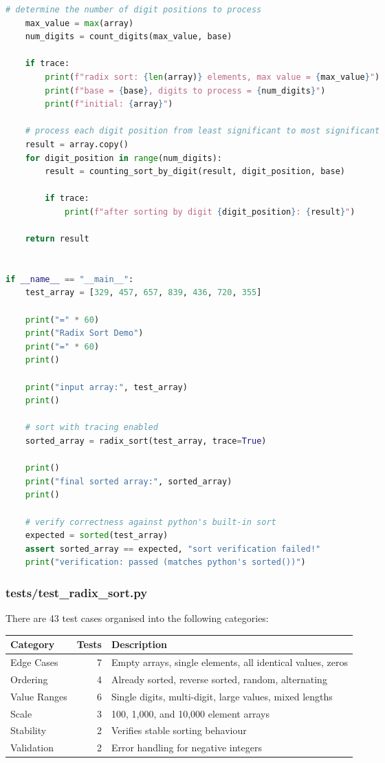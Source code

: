 \documentclass[12pt]{article}
\begin{document}
\begin{lstlisting}[language=Python]
    # determine the number of digit positions to process
    max_value = max(array)
    num_digits = count_digits(max_value, base)

    if trace:
        print(f"radix sort: {len(array)} elements, max value = {max_value}")
        print(f"base = {base}, digits to process = {num_digits}")
        print(f"initial: {array}")

    # process each digit position from least significant to most significant
    result = array.copy()
    for digit_position in range(num_digits):
        result = counting_sort_by_digit(result, digit_position, base)

        if trace:
            print(f"after sorting by digit {digit_position}: {result}")

    return result


if __name__ == "__main__":
    test_array = [329, 457, 657, 839, 436, 720, 355]

    print("=" * 60)
    print("Radix Sort Demo")
    print("=" * 60)
    print()

    print("input array:", test_array)
    print()

    # sort with tracing enabled
    sorted_array = radix_sort(test_array, trace=True)

    print()
    print("final sorted array:", sorted_array)
    print()

    # verify correctness against python's built-in sort
    expected = sorted(test_array)
    assert sorted_array == expected, "sort verification failed!"
    print("verification: passed (matches python's sorted())")
\end{lstlisting}

\subsubsection{tests/test\_radix\_sort.py}

There are 43 test cases organised into the following categories:

\begin{table}[h]
\centering
\begin{tabularx}{\linewidth}{@{}lrl@{}}
\toprule
\textbf{Category} & \textbf{Tests} & \textbf{Description} \\
\midrule
Edge Cases   & 7 & Empty arrays, single elements, all identical values, zeros \\
Ordering     & 4 & Already sorted, reverse sorted, random, alternating \\
Value Ranges & 6 & Single digits, multi-digit, large values, mixed lengths \\
Scale        & 3 & 100, 1,000, and 10,000 element arrays \\
Stability    & 2 & Verifies stable sorting behaviour \\
Validation   & 2 & Error handling for negative integers \\
\bottomrule
\end{tabularx}
\end{table}
\end{document}
